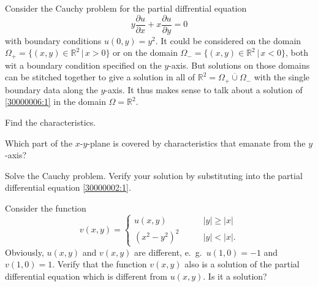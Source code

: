 Consider the Cauchy problem for the partial diffrential equation
\begin{equation}
y\frac{\partial u}{\partial x}+x\frac{\partial u}{\partial y}=0
\label{30000002:1}
\end{equation}
with boundary conditions $u(0,y)=y^2$.
It could be considered on the domain
$\Omega_+=\{ (x,y)\in\mathbb R^2\,|\, x > 0\}$
or on the domain
$\Omega_-=\{(x,y)\in\mathbb R^2\,|\, x <0\}$,
both wit a boundary condition specified on the $y$-axis.
But solutions on those domains can be stitched together to give a solution
in all of $\mathbb R^2=\overline{\Omega_+\cup\Omega_-}$ with the single
boundary data along the $y$-axis.
It thus makes sense to talk about a solution of 
\eqref{30000006:1} in the domain $\Omega=\mathbb R^2$.
\begin{teilaufgaben}
\item
Find the characteristics.
\item
Which part of the $x$-$y$-plane is covered by characteristics that emanate
from the $y$-axis?
\item
Solve the Cauchy problem.
Verify your solution by substituting into the partial differential equation
\eqref{30000002:1}.
\item
Consider the function
\[
v(x,y)=\begin{cases}
u(x,y)&\qquad |y|\ge |x|\\
(x^2-y^2)^2&\qquad |y|<|x|.
\end{cases}
\]
Obviously, $u(x,y)$ and $v(x,y)$ are different, e.~g.~$u(1,0)=-1$
and $v(1,0)=1$.
Verify that the function $v(x,y)$ also is a solution of the partial
differential equation which is different from $u(x,y)$.
Is it a solution?
\end{teilaufgaben}

